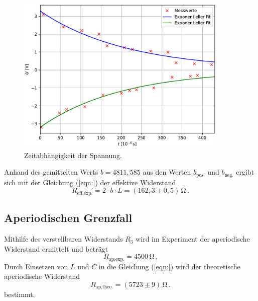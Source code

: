 \begin{figure}[H]
  \centering
  \includegraphics[width=0.90\textwidth]{plot_a.pdf}
  \caption{Zeitabhängigkeit der Spannung.}
  \label{fig:gedämpfteSchwingung}
\end{figure}
Anhand des gemittelten Werts $b = 4811,585$ aus den Werten $b_{\text{pos.}}$ und $b_{\text{neg.}}$ ergibt sich mit der Gleichung (\ref{eqn:})
der effektive Widerstand 
$$R_{\text{eff,exp.}} = 2\cdot b\cdot L = \left(162,3\pm0,5\right)\,\unit{\ohm}\,.$$
%
%
%
\subsection{Aperiodischen Grenzfall}
Mithilfe des verstellbaren Widerstands $R_3$ wird im Experiment der aperiodische Widerstand ermittelt und beträgt
$$R_{\text{ap,exp.}} = 4500\,\unit{\ohm}\,.$$
Durch Einsetzen von $L$ und $C$ in die Gleichung (\ref{eqn:}) wird der theoretische aperiodische Widerstand
$$R_{\text{ap,theo.}} = (5723\pm9)\,\unit{\ohm}\,.$$ bestimmt.
%
%
%
